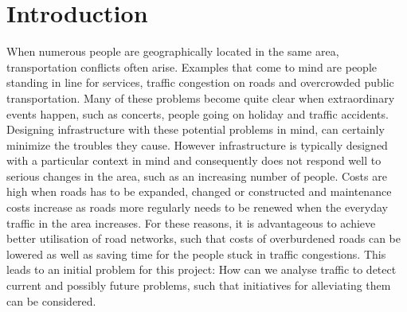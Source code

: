 \chapter{Introduction}
When numerous people are geographically located in the same area, transportation conflicts often arise. Examples that come to mind are people standing in line for services, traffic congestion on roads and overcrowded public transportation. Many of these problems become quite clear when extraordinary events happen, such as concerts, people going on holiday and traffic accidents. Designing infrastructure with these potential problems in mind, can certainly minimize the troubles they cause. However infrastructure is typically designed with a particular context in mind and consequently does not respond well to serious changes in the area, such as an increasing number of people. Costs are high when roads has to be expanded, changed or constructed and maintenance costs increase as roads more regularly needs to be renewed when the everyday traffic in the area increases. For these reasons, it is advantageous to achieve better utilisation of road networks, such that costs of overburdened roads can be lowered as well as saving time for the people stuck in traffic congestions. This leads to an initial problem for this project: How can we analyse traffic to detect current and possibly future problems, such that initiatives for alleviating them can be considered.